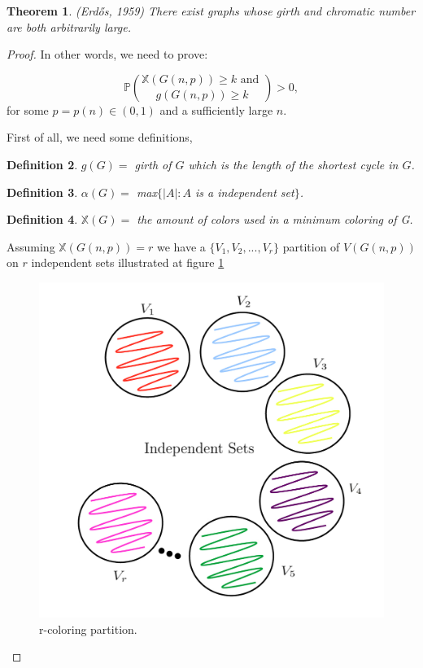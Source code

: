 \documentclass[12pt,twoside,a4paper]{book}
\numberwithin{equation}{section}
\newtheorem{theorem}             {Theorem}[section]
\newtheorem{definition}	[theorem] {Definition}
\theoremstyle{remark}
\begin{document}
\begin{theorem}(Erd\H{o}s, 1959) There exist graphs whose girth and chromatic number are both arbitrarily large.
\end{theorem}
\begin{proof}
In other words, we need to prove:

$$\mathbb{P}\binom{\mathbb{X}(G(n,p)) \geq k \text{ and }} {g(G(n,p)) \geq k} > 0 ,$$
for some $p =p(n) \in (0,1)$ and a sufficiently large $n$.

First of all, we need some definitions,
\begin{definition}
$g(G) =$ girth of $G$ which is the length of the shortest cycle in $G$. 
\end{definition}
\begin{definition}
$\alpha(G) =$ max$\{|A|: A$ is a independent set$\}$.
\end{definition}
\begin{definition}
$\mathbb{X}(G) =$ the amount of colors used in a minimum coloring of G.
\end{definition}
Assuming $\mathbb{X}(G(n,p)) = r$ we have a $\{V_1,V_2,...,V_r\}$ partition of $V(G(n,p))$ on $r$ independent sets illustrated at figure \ref{fig:r-partition}

\begin{figure}[!htb]
     \centering
     \includegraphics[scale=1]{Figuras/r-partion.jpg}
     \caption{r-coloring partition. }
     \label{fig:r-partition}
\end{figure}


\end{proof}
\end{document}
